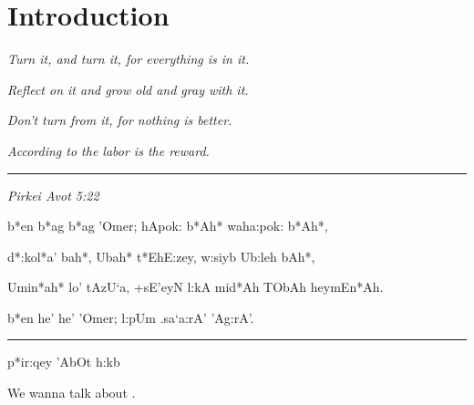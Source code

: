 \chapter{Introduction}

\begin{flushleft}
	\emph{Turn it, and turn it, for everything is in it.}

	\emph{Reflect on it and grow old and gray with it.}

	\emph{Don't turn from it, for nothing is better.}

	\emph{According to the labor is the reward.}

	\rule[0pt]{15em}{0.5pt}

	\emph{Pirkei Avot 5:22}
\end{flushleft}
\vspace{-8.59em}

\begin{cjhebrew}
	b*en b*ag b*ag 'Omer;
	hApok: b*Ah* waha:pok: b*Ah*\textnormal{,}

	d*:kol*a' bah*\textnormal{,}
	Ubah* t*EhE:zey\textnormal{,}
	w:siyb Ub:leh bAh*\textnormal{,}

	Umin*ah* lo' tAzU`a\textnormal{,}
	+sE'eyN l:kA mid*Ah TObAh heymEn*Ah\textnormal{.}

	b*en he' he' 'Omer;
	l:pUm .sa`a:rA' 'Ag:rA'\textnormal{.}

	\rule[0pt]{15em}{0.5pt}

	p*ir:qey 'AbOt h\textnormal{:}kb
\end{cjhebrew}

\vspace{2em}

We wanna talk about \cite{milnor1963groups}.

\lipsum[1-10]
